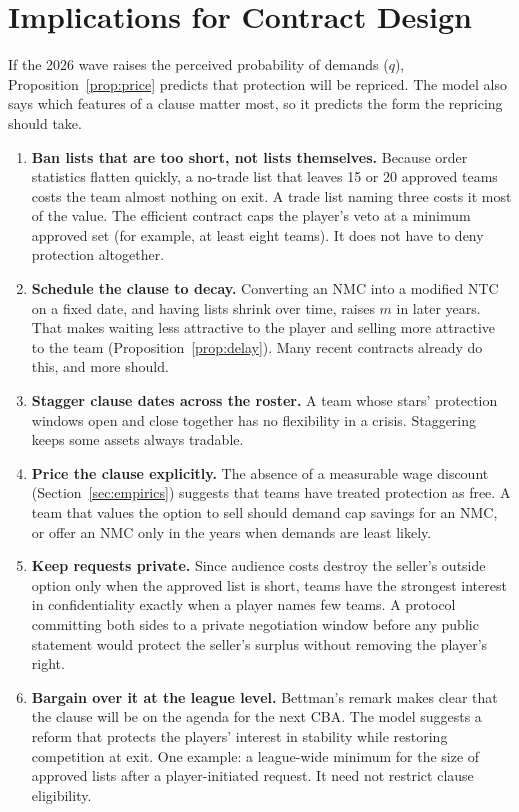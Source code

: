 \section{Implications for Contract Design}\label{sec:implications}

If the 2026 wave raises the perceived probability of demands ($q$), Proposition~\ref{prop:price} predicts that protection will be repriced. The model also says which features of a clause matter most, so it predicts the form the repricing should take.

\begin{enumerate}[leftmargin=*,itemsep=2pt]
\item \textbf{Ban lists that are too short, not lists themselves.} Because order statistics flatten quickly, a no-trade list that leaves 15 or 20 approved teams costs the team almost nothing on exit. A trade list naming three costs it most of the value. The efficient contract caps the player's veto at a minimum approved set (for example, at least eight teams). It does not have to deny protection altogether.
\item \textbf{Schedule the clause to decay.} Converting an NMC into a modified NTC on a fixed date, and having lists shrink over time, raises $m$ in later years. That makes waiting less attractive to the player and selling more attractive to the team (Proposition~\ref{prop:delay}). Many recent contracts already do this, and more should.
\item \textbf{Stagger clause dates across the roster.} A team whose stars' protection windows open and close together has no flexibility in a crisis. Staggering keeps some assets always tradable.
\item \textbf{Price the clause explicitly.} The absence of a measurable wage discount (Section~\ref{sec:empirics}) suggests that teams have treated protection as free. A team that values the option to sell should demand cap savings for an NMC, or offer an NMC only in the years when demands are least likely.
\item \textbf{Keep requests private.} Since audience costs destroy the seller's outside option only when the approved list is short, teams have the strongest interest in confidentiality exactly when a player names few teams. A protocol committing both sides to a private negotiation window before any public statement would protect the seller's surplus without removing the player's right.
\item \textbf{Bargain over it at the league level.} Bettman's remark makes clear that the clause will be on the agenda for the next CBA. The model suggests a reform that protects the players' interest in stability while restoring competition at exit. One example: a league-wide minimum for the size of approved lists after a player-initiated request. It need not restrict clause eligibility.
\end{enumerate}

